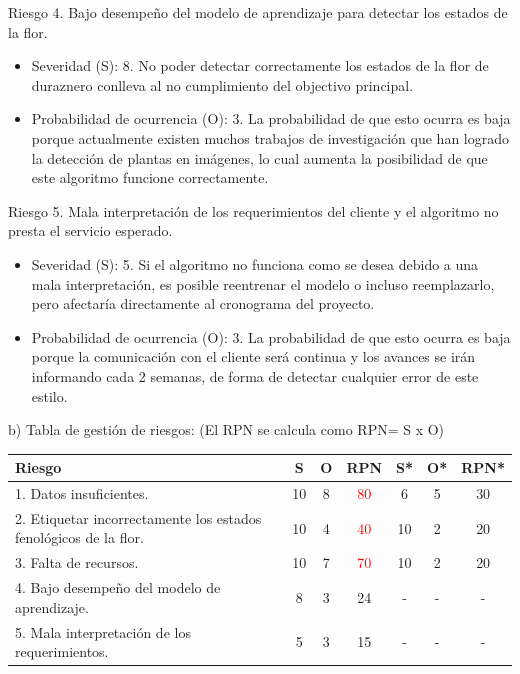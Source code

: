 \documentclass[
11pt, %
]{charter}
\begin{document}
Riesgo 4. Bajo desempeño del modelo de aprendizaje para detectar los estados de la flor.

\begin{itemize}
\item Severidad (S): 8. No poder detectar correctamente los estados de la flor de duraznero conlleva al no cumplimiento del objectivo principal. 

\item Probabilidad de ocurrencia (O): 3. La probabilidad de que esto ocurra es baja porque actualmente existen muchos trabajos de investigación que han logrado la detección de plantas en imágenes, lo cual aumenta la posibilidad de que este algoritmo funcione correctamente. 
\end{itemize}

Riesgo 5. Mala interpretación de los requerimientos del cliente y el algoritmo no presta el servicio esperado.

\begin{itemize}
\item Severidad (S): 5. Si el algoritmo no funciona como se desea debido a una mala interpretación, es posible reentrenar el modelo o incluso reemplazarlo, pero afectaría directamente al cronograma del proyecto. 

\item Probabilidad de ocurrencia (O): 3. La probabilidad de que esto ocurra es baja porque la comunicación con el cliente será continua y los avances se irán informando cada 2 semanas, de forma de detectar cualquier error de este estilo. 
\end{itemize}

b) Tabla de gestión de riesgos:      (El RPN se calcula como RPN= S x O)

\begin{table}[htpb]
\centering
\begin{tabularx}{\linewidth}{@{}|X|c|c|c|c|c|c|@{}}
\hline
\rowcolor[HTML]{C0C0C0} 
Riesgo & S & O & RPN & S* & O* & RPN* \\ \hline
1. Datos insuficientes.      &  10 & 8 &  \textcolor{red}{80}  &  6  &  5  &   30   \\ \hline
2. Etiquetar incorrectamente los estados fenológicos de la flor.      &  10 & 4  &     \textcolor{red}{40} & 10   & 2   &  20    \\ \hline
3. Falta de recursos.       &  10 & 7  &  \textcolor{red}{70}   &  10  & 2   & 20      \\ \hline
4. Bajo desempeño del modelo de aprendizaje.       &  8 & 3  & 24  &  -  &  -  &     - \\ \hline
5. Mala interpretación de los requerimientos.       & 5  & 3  &  15   &  -  &   - &     - \\ \hline
\end{tabularx}%
\end{table}
\end{document}
